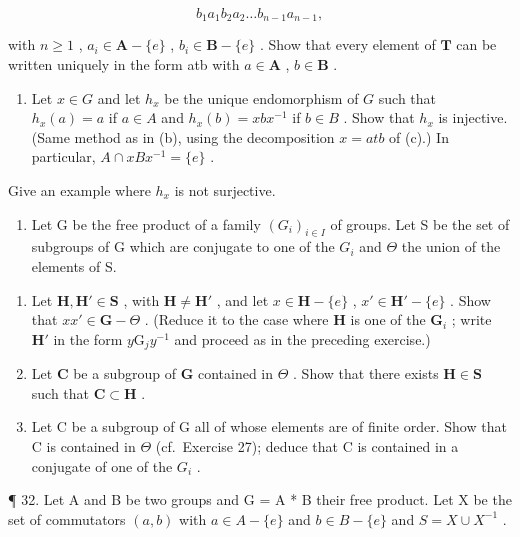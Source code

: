 \[
b _ {1} a _ {1} b _ {2} a _ {2} \dots b _ {n - 1} a _ {n - 1},
\]

with \(n \geqslant 1\) , \(a_i \in \mathbf{A} - \{e\}\) , \(b_i \in \mathbf{B} - \{e\}\) . Show that every element of \(\mathbf{T}\) can be written uniquely in the form atb with \(a \in \mathbf{A}\) , \(b \in \mathbf{B}\) .

\begin{enumerate}
\def\labelenumi{(\alph{enumi})}
\setcounter{enumi}{3}
\tightlist
\item
  Let \(x \in G\) and let \(h_x\) be the unique endomorphism of \(G\) such that \(h_x(a) = a\) if \(a \in A\) and \(h_x(b) = x b x^{-1}\) if \(b \in B\) . Show that \(h_x\) is injective. (Same method as in (b), using the decomposition \(x = a t b\) of (c).) In particular, \(A \cap x B x^{-1} = \{e\}\) .
\end{enumerate}

Give an example where \(h_{x}\) is not surjective.

\begin{enumerate}
\def\labelenumi{\arabic{enumi}.}
\setcounter{enumi}{30}
\tightlist
\item
  Let G be the free product of a family \((G_{i})_{i\in I}\) of groups. Let S be the set of subgroups of G which are conjugate to one of the \(G_{i}\) and \(\Theta\) the union of the elements of S.
\end{enumerate}

\begin{enumerate}
\def\labelenumi{(\alph{enumi})}
\item
  Let \(\mathbf{H}, \mathbf{H}' \in \mathbf{S}\) , with \(\mathbf{H} \neq \mathbf{H}'\) , and let \(x \in \mathbf{H} - \{e\}\) , \(x' \in \mathbf{H}' - \{e\}\) . Show that \(xx' \in \mathbf{G} - \Theta\) . (Reduce it to the case where \(\mathbf{H}\) is one of the \(\mathbf{G}_i\) ; write \(\mathbf{H}'\) in the form \(y\mathrm{G}_j y^{-1}\) and proceed as in the preceding exercise.)
\item
  Let \(\mathbf{C}\) be a subgroup of \(\mathbf{G}\) contained in \(\Theta\) . Show that there exists \(\mathbf{H} \in \mathbf{S}\) such that \(\mathbf{C} \subset \mathbf{H}\) .
\item
  Let C be a subgroup of G all of whose elements are of finite order. Show that C is contained in \(\Theta\) (cf.~Exercise 27); deduce that C is contained in a conjugate of one of the \(G_{i}\) .
\end{enumerate}

¶ 32. Let A and B be two groups and G = A * B their free product. Let X be the set of commutators \((a, b)\) with \(a \in A - \{e\}\) and \(b \in B - \{e\}\) and \(S = X \cup X^{-1}\) .

